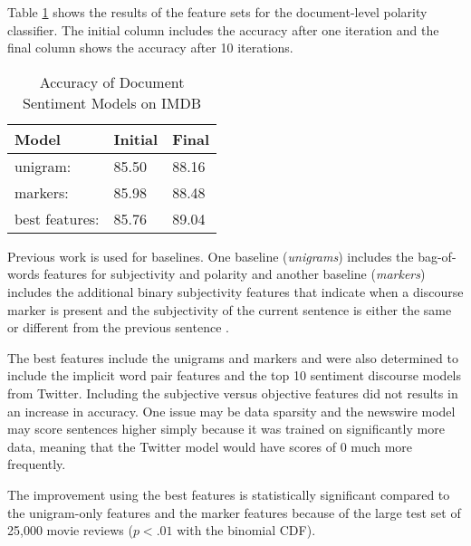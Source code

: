 \documentclass[11pt,letterpaper]{article}
\begin{document}
Table \ref{table:1} shows the results of the feature sets for the document-level polarity classifier.
The initial column includes the accuracy after one iteration and the final column
shows the accuracy after 10 iterations.

\begin{table}[h!]
\centering
\begin{tabular}{|l|l|l|}
\hline
Model & Initial & Final \\
\hline
unigram: & 85.50 & 88.16 \\
\hline
markers: & 85.98 & 88.48 \\
\hline
\hline
best features: & 85.76 & 89.04 \\
\hline

\end{tabular}
\caption{Accuracy of Document Sentiment Models on IMDB}
\label{table:1}
\end{table}

Previous work is used for baselines. One baseline (\emph{unigrams}) includes the bag-of-words features for subjectivity and polarity \cite{Yesselina} and another
baseline (\emph{markers}) includes the additional binary subjectivity features that indicate when a discourse marker is present and the subjectivity of the current
sentence is either the same or different from the previous sentence \cite {Trivedi}.

The best features include the unigrams and markers and were also determined to include the implicit word pair
features and the top 10 sentiment discourse models from Twitter.
Including the subjective versus objective features did not results in an increase in accuracy.
 One issue may be data sparsity and the newswire model may score sentences higher simply because it was trained on significantly more data,
meaning that the Twitter model would have scores of 0 much more frequently.

The improvement using the best features is statistically significant compared to the unigram-only features and the marker features
because of the large test set of 25,000 movie reviews
($p < .01$ with the binomial CDF).
\end{document}
